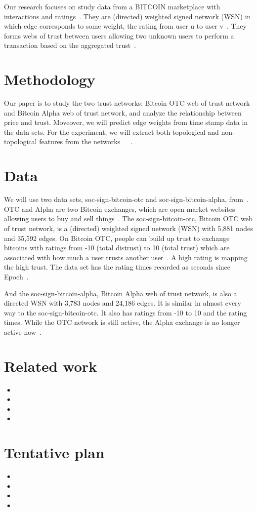 \documentclass[onecolumn, 12pt]{IEEEtran}
\begin{document}
Our research focuses on study data from a BITCOIN marketplace with interactions and ratings~\cite{aw2018analyzing}.
They are (directed) weighted signed network (WSN) in which edge corresponds to some weight, the rating from user u to user v~\cite{moindrot2017trust}.
They forms webs of trust between users allowing two unknown users to perform a transaction based on the aggregated trust~\cite{moindrot2017trust}.

\section{Methodology}
Our paper is to study the two trust networks: Bitcoin OTC web of trust network and Bitcoin Alpha web of trust network, and analyze the relationship between price and trust. Moveover, we will predict edge weights from time stamp data in the data sets.
For the experiment, we will extract both topological and non-topological features from the networks~\cite{liben2007link}~\cite{al2006link}~\cite{davis2011multi}.
\section{Data}
We will use two data sets, soc-sign-bitcoin-otc and soc-sign-bitcoin-alpha, from~\cite{snapnets}.
OTC and Alpha are two Bitcoin exchanges, which are open market websites allowing users to buy and sell things~\cite{snapnets}.
The soc-sign-bitcoin-otc, Bitcoin OTC web of trust network, is a (directed) weighted signed network (WSN) with 5,881 nodes and 35,592 edges.
On Bitcoin OTC, people can build up trust to exchange bitcoins with ratings from -10 (total distrust) to 10 (total trust) which are associated with how much a user trusts another user~\cite{moindrot2017trust}. A high rating is mapping the high trust. The data set has the rating times recorded as seconds since Epoch~\cite{snapnets}.

And the soc-sign-bitcoin-alpha, Bitcoin Alpha web of trust network, is also a directed WSN with 3,783 nodes and 24,186 edges.
It is similar in almost every way to the soc-sign-bitcoin-otc. It also has ratings from -10 to 10 and the rating times. While the OTC network
is still active, the Alpha exchange is no longer active now~\cite{moindrot2017trust}.

\section{Related work}
\begin{itemize}
 \item
 \item
 \item
 \item
 \end{itemize}
\section{Tentative plan}
\begin{itemize}
 \item
 \item
 \item
 \item
\end{itemize}

%



\end{document}
